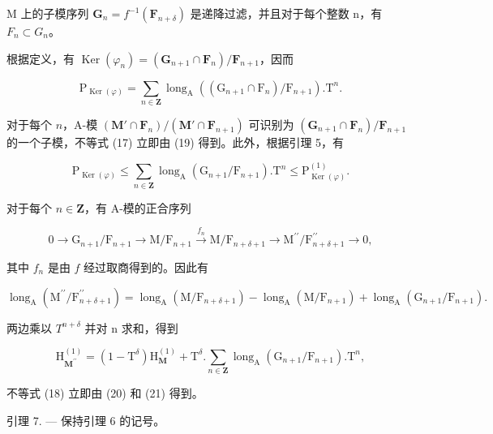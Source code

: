 M 上的子模序列 \(\mathbf{G}_{n}=f^{-1}(\mathbf{F}_{n+\delta})\) 是递降过滤，并且对于每个整数 n，有 \(F_{n}\subset G_{n}\)。

根据定义，有 \(\operatorname{Ker}(\varphi_n) = (\mathbf{G}_{n+1} \cap \mathbf{F}_n)/\mathbf{F}_{n+1}\)，因而

\[
\mathrm{P} _ {\operatorname{Ker} (\varphi)} = \sum_ {n \in \mathbf {Z}} \operatorname{long} _ {\mathrm{A}} ((\mathrm{G} _ {n + 1} \cap \mathrm{F} _ {n}) / \mathrm{F} _ {n + 1}). \mathrm{T} ^ {n}.\tag{19}
\]

对于每个 \(n\)，A-模 \((\mathbf{M}' \cap \mathbf{F}_n) / (\mathbf{M}' \cap \mathbf{F}_{n+1})\) 可识别为 \((\mathbf{G}_{n+1} \cap \mathbf{F}_n) / \mathbf{F}_{n+1}\) 的一个子模，不等式 (17) 立即由 (19) 得到。此外，根据引理 5，有

\[
\mathrm{P} _ {\operatorname{Ker} (\varphi)} \leqslant \sum_ {n \in \mathbf {Z}} \operatorname{long} _ {\mathrm{A}} \left(\mathrm{G} _ {n + 1} / \mathrm{F} _ {n + 1}\right). \mathrm{T} ^ {n} \leqslant \mathrm{P} _ {\operatorname{Ker} (\varphi)} ^ {(1)}.\tag{20}
\]

对于每个 \(n \in \mathbf{Z}\)，有 A-模的正合序列

\[
0 \longrightarrow \mathrm{G} _ {n + 1} / \mathrm{F} _ {n + 1} \longrightarrow \mathrm{M} / \mathrm{F} _ {n + 1} \xrightarrow {f _ {n}} \mathrm{M} / \mathrm{F} _ {n + \delta + 1} \longrightarrow \mathrm{M} ^ {\prime \prime} / \mathrm{F} _ {n + \delta + 1} ^ {\prime \prime} \longrightarrow 0,
\]

其中 \(f_{n}\) 是由 \(f\) 经过取商得到的。因此有

\[
\operatorname{long} _ {\mathrm{A}} \left(\mathrm{M} ^ {\prime \prime} / \mathrm{F} _ {n + \delta + 1} ^ {\prime \prime}\right) = \operatorname{long} _ {\mathrm{A}} \left(\mathrm{M} / \mathrm{F} _ {n + \delta + 1}\right) - \operatorname{long} _ {\mathrm{A}} \left(\mathrm{M} / \mathrm{F} _ {n + 1}\right) + \operatorname{long} _ {\mathrm{A}} \left(\mathrm{G} _ {n + 1} / \mathrm{F} _ {n + 1}\right).
\]

两边乘以 \(T^{n+\delta}\) 并对 n 求和，得到

\[
\mathrm{H} _ {\mathbf {M} ^ {\prime \prime}} ^ {(1)} = (1 - \mathrm{T} ^ {\delta}) \mathrm{H} _ {\mathbf {M}} ^ {(1)} + \mathrm{T} ^ {\delta}. \sum_ {n \in \mathbf {Z}} \operatorname{long} _ {\mathrm{A}} (\mathrm{G} _ {n + 1} / \mathrm{F} _ {n + 1}). \mathrm{T} ^ {n},\tag{21}
\]

不等式 (18) 立即由 (20) 和 (21) 得到。

引理 7. — 保持引理 6 的记号。

